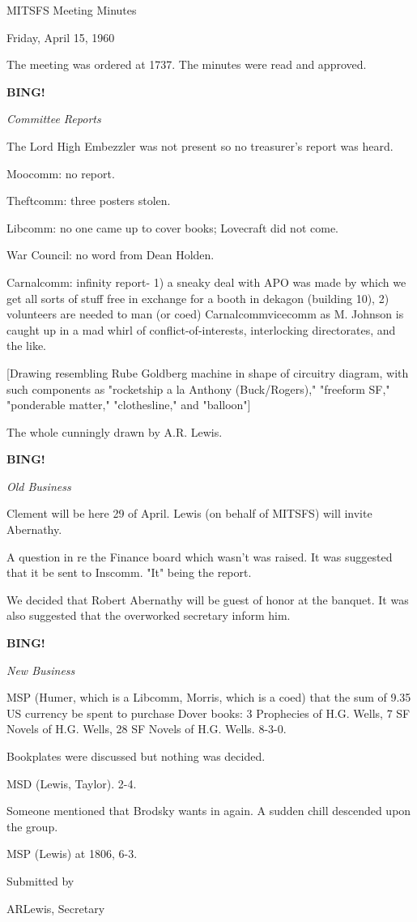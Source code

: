 \documentclass[12pt]{article}
\newcommand{\bing}{{\bf BING!} }
\newcommand{\goto}[1]{\bing \vskip 12pt \centerline{{\em{#1}}}}
\begin{document}
\begin{center}

MITSFS Meeting Minutes

Friday, April 15, 1960

\end{center}
 
\vspace{12pt}

\setlength{\parskip}{6pt}

\noindent
The meeting was ordered at 1737. The minutes were read and approved.

\goto{Committee Reports}

The Lord High Embezzler was not present so no treasurer's report was heard.

Moocomm: no report.

Theftcomm: three posters stolen.

Libcomm: no one came up to cover books; Lovecraft did not come.

War Council: no word from Dean Holden.

Carnalcomm: infinity report- 1) a sneaky deal with APO was made by which we get all sorts of stuff free in exchange for a booth in dekagon (building 10), 2) volunteers are needed to man (or coed) Carnalcommvicecomm as M. Johnson is caught up in a mad whirl of conflict-of-interests, interlocking directorates, and the like.

[Drawing resembling Rube Goldberg machine in shape of circuitry diagram, with such components as "rocketship a la Anthony (Buck/Rogers)," "freeform SF," "ponderable matter," "clothesline," and "balloon"]

The whole cunningly drawn by A.R. Lewis.

\goto{Old Business}

Clement will be here 29 of April. Lewis (on behalf of MITSFS) will invite Abernathy.

A question in re the Finance board which wasn't was raised. It was suggested that it be sent to Inscomm. "It" being the report.

We decided that Robert Abernathy will be guest of honor at the banquet. It was also suggested that the overworked secretary inform him.

\goto{New Business}

MSP (Humer, which is a Libcomm, Morris, which is a coed) that the sum of 9.35 US currency be spent to purchase Dover books: 3 Prophecies of H.G. Wells, 7 SF Novels of H.G. Wells, 28 SF Novels of H.G. Wells. 8-3-0.

Bookplates were discussed but nothing was decided.

MSD (Lewis, Taylor). 2-4.

Someone mentioned that Brodsky wants in again. A sudden chill descended upon the group.

MSP (Lewis) at 1806, 6-3.

\vspace{12pt}

\centerline{Submitted by}
\centerline{ARLewis, Secretary}
\end{document}
